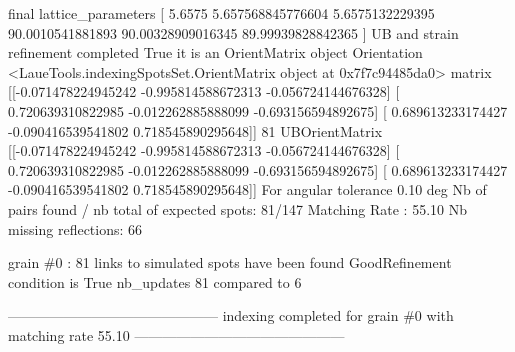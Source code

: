 \documentclass[letterpaper,10pt,english]{sphinxmanual}
\begin{document}
\begin{sphinxalltt}
final lattice\_parameters {[} 5.6575             5.657568845776604  5.6575132229395
 90.0010541881893   90.00328909016345  89.99939828842365 {]}
UB and strain refinement completed
True it is an OrientMatrix object
Orientation \textless{}LaueTools.indexingSpotsSet.OrientMatrix object at 0x7f7c94485da0\textgreater{}
matrix {[}{[}-0.071478224945242 -0.995814588672313 -0.056724144676328{]}
 {[} 0.720639310822985 -0.012262885888099 -0.693156594892675{]}
 {[} 0.689613233174427 -0.090416539541802  0.718545890295648{]}{]}
 81
UBOrientMatrix {[}{[}-0.071478224945242 -0.995814588672313 -0.056724144676328{]}
 {[} 0.720639310822985 -0.012262885888099 -0.693156594892675{]}
 {[} 0.689613233174427 -0.090416539541802  0.718545890295648{]}{]}
For angular tolerance 0.10 deg
Nb of pairs found / nb total of expected spots: 81/147
Matching Rate : 55.10
Nb missing reflections: 66

grain \#0 : 81 links to simulated spots have been found
GoodRefinement condition is  True
nb\_updates 81 compared to 6

---------------------------------------------
indexing completed for grain \#0 with matching rate 55.10
---------------------------------------------


\end{sphinxalltt}
\end{document}
